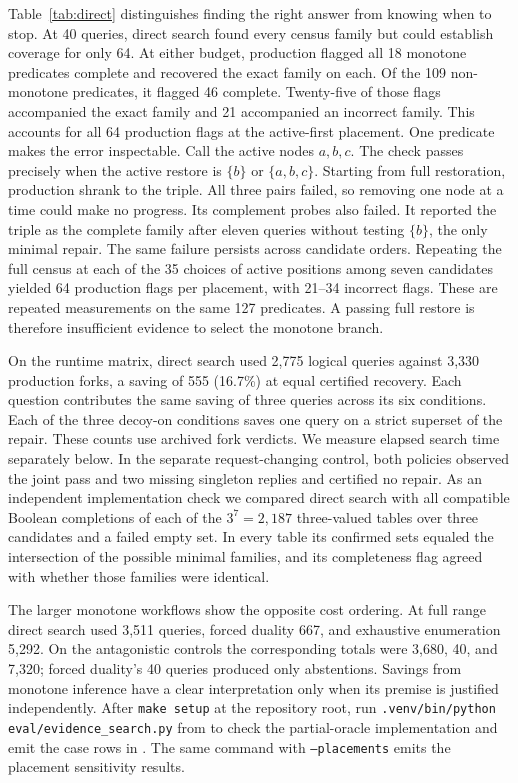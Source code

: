 \documentclass[11pt,letterpaper]{article}
\begin{document}
Table~\ref{tab:direct} distinguishes finding the right answer from knowing when to stop. At 40 queries, direct search found every census family but could establish coverage for only 64. At either budget, production flagged all 18 monotone predicates complete and recovered the exact family on each. Of the 109 non-monotone predicates, it flagged 46 complete. Twenty-five of those flags accompanied the exact family and 21 accompanied an incorrect family. This accounts for all 64 production flags at the active-first placement. One predicate makes the error inspectable. Call the active nodes $a,b,c$. The check passes precisely when the active restore is $\{b\}$ or $\{a,b,c\}$. Starting from full restoration, production shrank to the triple. All three pairs failed, so removing one node at a time could make no progress. Its complement probes also failed. It reported the triple as the complete family after eleven queries without testing $\{b\}$, the only minimal repair. The same failure persists across candidate orders. Repeating the full census at each of the 35 choices of active positions among seven candidates yielded 64 production flags per placement, with 21--34 incorrect flags. These are repeated measurements on the same 127 predicates. A passing full restore is therefore insufficient evidence to select the monotone branch.

On the runtime matrix, direct search used 2,775 logical queries against 3,330 production forks, a saving of 555 (16.7\%) at equal certified recovery. Each question contributes the same saving of three queries across its six conditions. Each of the three decoy-on conditions saves one query on a strict superset of the repair. These counts use archived fork verdicts. We measure elapsed search time separately below. In the separate request-changing control, both policies observed the joint pass and two missing singleton replies and certified no repair. As an independent implementation check we compared direct search with all compatible Boolean completions of each of the $3^7=2{,}187$ three-valued tables over three candidates and a failed empty set. In every table its confirmed sets equaled the intersection of the possible minimal families, and its completeness flag agreed with whether those families were identical.

The larger monotone workflows show the opposite cost ordering. At full range direct search used 3,511 queries, forced duality 667, and exhaustive enumeration 5,292. On the antagonistic controls the corresponding totals were 3,680, 40, and 7,320; forced duality's 40 queries produced only abstentions. Savings from monotone inference have a clear interpretation only when its premise is justified independently. After \texttt{make setup} at the repository root, run \texttt{.venv/bin/python eval/evidence\_search.py} from  to check the partial-oracle implementation and emit the case rows in . The same command with \texttt{--placements} emits the placement sensitivity results.
\end{document}
